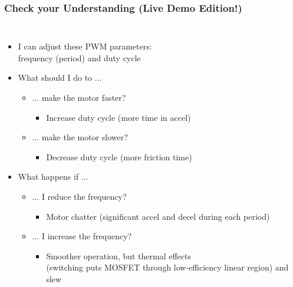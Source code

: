 \documentclass{beamer}
\begin{document}
\begin{frame}
\frametitle{Check your Understanding {\small (Live Demo Edition!)}}
\begin{columns}[t]
\begin{itemize}
  \item I can adjust these PWM parameters: \\ frequency (period) and duty cycle
  \item What should I do to ...
  \begin{itemize}
    \item ... make the motor faster?
    \begin{itemize}
      \item<2-> Increase duty cycle (more time in accel)
    \end{itemize}
    \item ... make the motor slower?
    \begin{itemize}
      \item<3-> Decrease duty cycle (more friction time)
    \end{itemize}
  \end{itemize}
  \item What happens if ...
  \begin{itemize}
    \item ... I reduce the frequency?
    \begin{itemize}
      \item<4-> Motor chatter (significant accel and decel during each period)
    \end{itemize}
    \item ... I increase the frequency?
    \begin{itemize}
      \item<5-> Smoother operation, but thermal effects \\ (switching puts MOSFET through low-efficiency linear region) and slew
    \end{itemize}
  \end{itemize}
\end{itemize}


\end{columns}
\end{frame}
\end{document}
